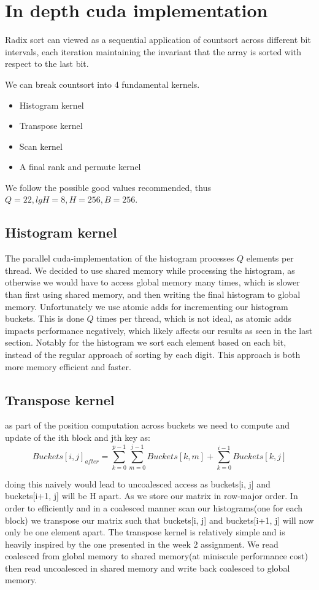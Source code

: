 \documentclass{article}
\begin{document}
\section{In depth cuda implementation}

Radix sort can viewed as a sequential application of countsort across different bit intervals, each iteration maintaining the invariant that
the array is sorted with respect to the last bit.

We can break countsort into 4 fundamental kernels.

\begin{itemize}
    \item Histogram kernel
    \item Transpose kernel
    \item Scan kernel
    \item A final rank and permute kernel
\end{itemize}

We follow the possible good values recommended, thus $Q = 22, lgH = 8, H = 256, B = 256$.

\subsection{Histogram kernel}
The parallel cuda-implementation of the histogram processes $Q$ elements per thread. 
We decided to use shared memory while processing the histogram, as otherwise we would have to access global memory many times, which is slower than first using shared memory, and then writing the final histogram to global memory.
Unfortunately we use atomic adds for incrementing our histogram buckets. This is done $Q$ times per thread, which is not ideal, as atomic adds impacts performance negatively, which likely affects our results as seen in the last section.
Notably for the histogram we sort each element based on each bit, instead of the regular approach of sorting by each digit. This approach is both more memory efficient and faster.  

\subsection{Transpose kernel}

as part of the position computation across buckets we need to compute and update of the ith block and jth key as:
\[
Buckets[i,j]_{after} = \sum_{k=0}^{p-1} \sum_{m=0}^{j-1} Buckets[k,m] + \sum_{k=0}^{i-1} Buckets[k,j]
\]

doing this naively would lead to uncoalesced access as buckets[i, j] and buckets[i+1, j] will be H apart. As we store our matrix in row-major order.
In order to efficiently and in a coalesced manner scan our histograms(one for each block) we transpose our matrix such that buckets[i, j] and buckets[i+1, j] will now only be one element apart.
The transpose kernel is relatively simple and is heavily inspired by the one presented in the week 2 assignment. 
We read coalesced from global memory to shared memory(at miniscule performance cost) then read uncoalesced in shared memory and write back coalesced to global memory.
\end{document}
